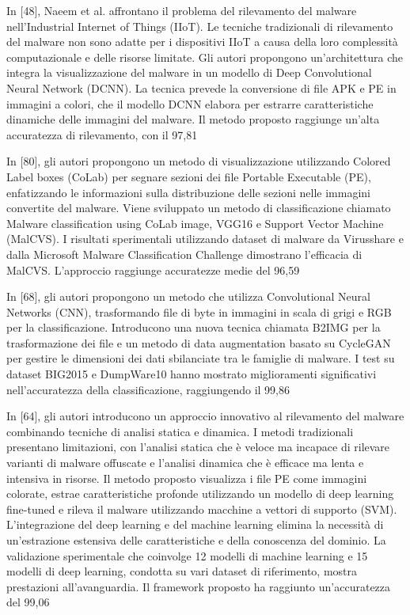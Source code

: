 In [48], Naeem et al. affrontano il problema del rilevamento del malware nell'Industrial Internet of Things (IIoT). Le tecniche tradizionali di rilevamento del malware non sono adatte per i dispositivi IIoT a causa della loro complessità computazionale e delle risorse limitate. Gli autori propongono un'architettura che integra la visualizzazione del malware in un modello di Deep Convolutional Neural Network (DCNN). La tecnica prevede la conversione di file APK e PE in immagini a colori, che il modello DCNN elabora per estrarre caratteristiche dinamiche delle immagini del malware. Il metodo proposto raggiunge un'alta accuratezza di rilevamento, con il 97,81%

In [80], gli autori propongono un metodo di visualizzazione utilizzando Colored Label boxes (CoLab) per segnare sezioni dei file Portable Executable (PE), enfatizzando le informazioni sulla distribuzione delle sezioni nelle immagini convertite del malware. Viene sviluppato un metodo di classificazione chiamato Malware classification using CoLab image, VGG16 e Support Vector Machine (MalCVS). I risultati sperimentali utilizzando dataset di malware da Virusshare e dalla Microsoft Malware Classification Challenge dimostrano l'efficacia di MalCVS. L'approccio raggiunge accuratezze medie del 96,59%

In [68], gli autori propongono un metodo che utilizza Convolutional Neural Networks (CNN), trasformando file di byte in immagini in scala di grigi e RGB per la classificazione. Introducono una nuova tecnica chiamata B2IMG per la trasformazione dei file e un metodo di data augmentation basato su CycleGAN per gestire le dimensioni dei dati sbilanciate tra le famiglie di malware. I test su dataset BIG2015 e DumpWare10 hanno mostrato miglioramenti significativi nell'accuratezza della classificazione, raggiungendo il 99,86%

In [64], gli autori introducono un approccio innovativo al rilevamento del malware combinando tecniche di analisi statica e dinamica. I metodi tradizionali presentano limitazioni, con l'analisi statica che è veloce ma incapace di rilevare varianti di malware offuscate e l'analisi dinamica che è efficace ma lenta e intensiva in risorse. Il metodo proposto visualizza i file PE come immagini colorate, estrae caratteristiche profonde utilizzando un modello di deep learning fine-tuned e rileva il malware utilizzando macchine a vettori di supporto (SVM). L'integrazione del deep learning e del machine learning elimina la necessità di un'estrazione estensiva delle caratteristiche e della conoscenza del dominio. La validazione sperimentale che coinvolge 12 modelli di machine learning e 15 modelli di deep learning, condotta su vari dataset di riferimento, mostra prestazioni all'avanguardia. Il framework proposto ha raggiunto un'accuratezza del 99,06%

